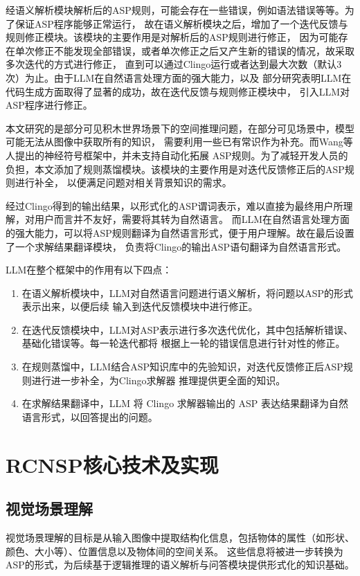 经语义解析模块解析后的ASP规则，可能会存在一些错误，例如语法错误等等。为了保证ASP程序能够正常运行，
故在语义解析模块之后，增加了一个迭代反馈与规则修正模块。该模块的主要作用是对解析后的ASP规则进行修正，
因为可能存在单次修正不能发现全部错误，或者单次修正之后又产生新的错误的情况，故采取多次迭代的方式进行修正，
直到可以通过Clingo运行或者达到最大次数（默认3次）为止。由于LLM在自然语言处理方面的强大能力，以及
部分研究表明LLM在代码生成方面取得了显著的成功\cite{gao2023pal,he2023solving}，故在迭代反馈与规则修正模块中，
引入LLM对ASP程序进行修正。

本文研究的是部分可见积木世界场景下的空间推理问题，在部分可见场景中，模型可能无法从图像中获取所有的知识，
需要利用一些已有常识作为补充。而Wang\cite{wang2024dspy}等人提出的神经符号框架中，并未支持自动化拓展
ASP规则。为了减轻开发人员的负担，本文添加了规则蒸馏模块。该模块的主要作用是对迭代反馈修正后的ASP规则进行补全，
以便满足问题对相关背景知识的需求。

经过Clingo得到的输出结果，以形式化的ASP谓词表示，难以直接为最终用户所理解，对用户而言并不友好，需要将其转为自然语言。
而LLM在自然语言处理方面的强大能力，可以将ASP规则翻译为自然语言形式，便于用户理解。故在最后设置了一个求解结果翻译模块，
负责将Clingo的输出ASP语句翻译为自然语言形式。

LLM在整个框架中的作用有以下四点：
\begin{enumerate}[nosep]
    \item 在语义解析模块中，LLM对自然语言问题进行语义解析，将问题以ASP的形式表示出来，以便后续
输入到迭代反馈模块中进行修正。
    \item 在迭代反馈模块中，LLM对ASP表示进行多次迭代优化，其中包括解析错误、基础化错误等。每一轮迭代都将
根据上一轮的错误信息进行针对性的修正。
    \item 在规则蒸馏中，LLM结合ASP知识库中的先验知识，对迭代反馈修正后ASP规则进行进一步补全，为Clingo求解器
推理提供更全面的知识。
    \item 在求解结果翻译中，LLM 将 Clingo 求解器输出的 ASP 表达结果翻译为自然语言形式，以回答提出的问题。
\end{enumerate}
\section{RCNSP核心技术及实现}
\subsection{视觉场景理解}
视觉场景理解的目标是从输入图像中提取结构化信息，包括物体的属性（如形状、颜色、大小等）、位置信息以及物体间的空间关系。
这些信息将被进一步转换为ASP的形式，为后续基于逻辑推理的语义解析与问答模块提供形式化的知识基础。

